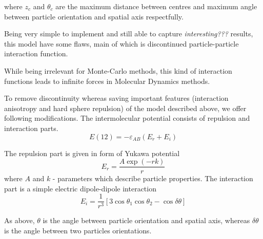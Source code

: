 where $z_c$ and $\theta_c$ are the maximum distance between centres and maximum angle between particle orientation and spatial axis respectfully.

Being very simple to implement and still able to capture \emph{interesting???} results, this model have some flaws, main of which is discontinued particle-particle interaction function.

While being irrelevant for Monte-Carlo methods, this kind of interaction functions leads to infinite forces in Molecular Dynamics methods.

To remove discontinuity whereas saving important features (interaction anisotropy and hard sphere repulsion) of the model described above, we offer following modifications.
The intermolecular potential consists of repulsion and interaction parts.
\begin{equation}
E(12) = - \varepsilon_{AB} (E_{r} + E_{i})
\end{equation}

The repulsion part is given in form of Yukawa potential
\begin{equation}
E_{r} = \frac{A \exp(-r k)}{r}
\end{equation}
where $A$ and $k$ - parameters which describe particle properties. The interaction part is a simple electric dipole-dipole interaction
\begin{equation}
E_{i} = \frac{1}{r^3} [3 \cos \theta_1 \cos \theta_2 - \cos \delta \theta]
\end{equation}

As above, $\theta$ is the angle between particle orientation and spatial axis, whereas $\delta \theta$ is the angle between two particles orientations.
